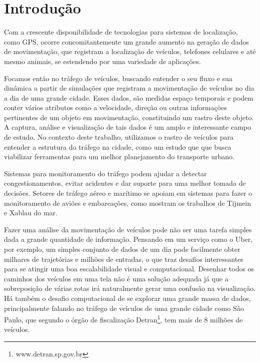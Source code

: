 \chapter{Introdução}
\label{cap:introducao}


Com a crescente disponibilidade de tecnologias para sistemas de localização,
como GPS, ocorre concomitantemente um grande aumento na geração de dados de
movimentação, que registram a localização de veículos, telefones celulares e
até mesmo animais, se estendendo por uma variedade de aplicações.

Focamos então no tráfego de veículos, buscando entender
o seu fluxo e sua dinâmica a partir de simulações que registram a movimentação
de veículos no dia a dia de uma grande cidade.  Esses dados, são medidas espaço
temporais e podem conter vários atributos como
a velocidade, direção ou outras informações pertinentes de um objeto em movimentação,
constituindo um rastro deste objeto. A captura, análise e visualização de tais
dados é um amplo e interessante campo de estudo. No contexto deste trabalho, utilizamos
o rastro de veículos para  entender a estrutura do tráfego na cidade, como um
estudo que que busca viabilizar ferramentas para um melhor planejamento do transporte urbano.

Sistemas para monitoramento do tráfego podem ajudar a detectar congestionamentos,
evitar acidentes e dar suporte para uma melhor tomada de decisões. Setores de tráfego
aéreo e marítimo se apoiam em sistemas para fazer o monitoramento de aviões
e embarcações, como mostram os trabalhos de Tijmein e Xablau do mar.

Fazer uma análise da movimentação de veículos pode não ser uma tarefa simples dada
a grande quantidade de informação. Pensando em um serviço como o Uber, por exemplo,
um simples conjunto de dados de um dia pode facilmente obter milhares de trajetórias e milhões
de entradas, o que traz desafios interessantes para se atingir uma boa escalabilidade
visual e computacional. Desenhar todos os caminhos dos veículos em uma tela  não é uma solução
adequada já que a sobreposição de várias rotas irá naturalmente gerar uma confusão na visualização.
Há também o desafio computacional de se explorar uma grande massa de dados, principalmente
falando no tráfego de veículos de uma grande cidade como São Paulo, 
que segundo o órgão de fiscalização
Detran\footnote{www.detran.sp.gov.br}, tem mais de 8 milhões de veículos.

